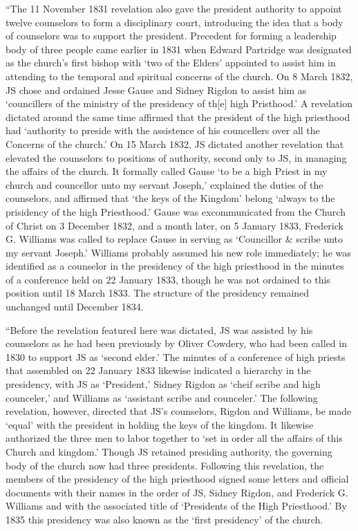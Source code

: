 			``The 11 November 1831 revelation also gave the president authority to appoint twelve counselors to form a disciplinary court, introducing the idea that a body of counselors was to support the president. Precedent for forming a leadership body of three people came earlier in 1831 when Edward Partridge was designated as the church's first bishop with `two of the Elders' appointed to assist him in attending to the temporal and spiritual concerns of the church. On 8 March 1832, JS chose and ordained Jesse Gause and Sidney Rigdon to assist him as `councillers of the ministry of the presidency of th[e] high Pristhood.' A revelation dictated around the same time affirmed that the president of the high priesthood had `authority to preside with the assistence of his councellers over all the Concerns of the church.' On 15 March 1832, JS dictated another revelation that elevated the counselors to positions of authority, second only to JS, in managing the affairs of the church. It formally called Gause `to be a high Priest in my church and councellor unto my servant Joseph,' explained the duties of the counselors, and affirmed that `the keys of the Kingdom' belong `always to the prisidency of the high Priesthood.' Gause was excommunicated from the Church of Christ on 3 December 1832, and a month later, on 5 January 1833, Frederick G. Williams was called to replace Gause in serving as `Councillor \& scribe unto my servant Joseph.' Williams probably assumed his new role immediately; he was identified as a counselor in the presidency of the high priesthood in the minutes of a conference held on 22 January 1833, though he was not ordained to this position until 18 March 1833. The structure of the presidency remained unchanged until December 1834.
			
			``Before the revelation featured here was dictated, JS was assisted by his counselors as he had been previously by Oliver Cowdery, who had been called in 1830 to support JS as `second elder.' The minutes of a conference of high priests that assembled on 22 January 1833 likewise indicated a hierarchy in the presidency, with JS as `President,' Sidney Rigdon as `cheif scribe and high counceler,' and Williams as `assistant scribe and counceler.' The following revelation, however, directed that JS's counselors, Rigdon and Williams, be made `equal' with the president in holding the keys of the kingdom. It likewise authorized the three men to labor together to `set in order all the affairs of this Church and kingdom.' Though JS retained presiding authority, the governing body of the church now had three presidents. Following this revelation, the members of the presidency of the high priesthood signed some letters and official documents with their names in the order of JS, Sidney Rigdon, and Frederick G. Williams and with the associated title of `Presidents of the High Priesthood.' By 1835 this presidency was also known as the `first presidency' of the church.
			
